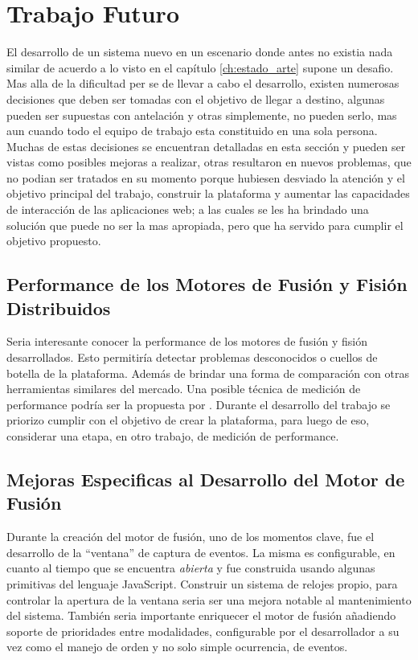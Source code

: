 \section{Trabajo Futuro} \label{sec:end_future}
El desarrollo de un sistema nuevo en un escenario donde antes no existia nada similar de acuerdo a lo visto en el capítulo \ref{ch:estado_arte} supone un desafio. Mas alla de la dificultad per se de llevar a cabo el desarrollo, existen numerosas decisiones que deben ser tomadas con el objetivo de llegar a destino, algunas pueden ser supuestas con antelación y otras simplemente, no pueden serlo, mas aun cuando todo el equipo de trabajo esta constituido en una sola persona. Muchas de estas decisiones se encuentran detalladas en esta sección y pueden ser vistas como posibles mejoras a realizar, otras resultaron en nuevos problemas, que no podian ser tratados en su momento porque hubiesen desviado la atención y el objetivo principal del trabajo, construir la plataforma y aumentar las capacidades de interacción de las aplicaciones web; a las cuales se les ha brindado una solución que puede no ser la mas apropiada, pero que ha servido para cumplir el objetivo propuesto.

\subsection{Performance de los Motores de Fusión y Fisión Distribuidos}
Seria interesante conocer la performance de los motores de fusión y fisión desarrollados. Esto permitiría detectar problemas desconocidos o cuellos de botella de la plataforma. Además de brindar una forma de comparación con otras herramientas similares del mercado. Una posible técnica de medición de performance podría ser la propuesta por \citet{dumas2009benchmarking}. Durante el desarrollo del trabajo se priorizo cumplir con el objetivo de crear la plataforma, para luego de eso, considerar una etapa, en otro trabajo, de medición de performance.

\subsection{Mejoras Especificas al Desarrollo del Motor de Fusión}
Durante la creación del motor de fusión, uno de los momentos clave, fue el desarrollo de la ``ventana'' de captura de eventos. La misma es configurable, en cuanto al tiempo que se encuentra \textit{abierta} y fue construida usando algunas primitivas del lenguaje JavaScript. Construir un sistema de relojes propio, para controlar la apertura de la ventana seria ser una mejora notable al mantenimiento del sistema. También seria importante enriquecer el motor de fusión añadiendo soporte de prioridades entre modalidades, configurable por el desarrollador a su vez como el manejo de orden y no solo simple ocurrencia, de eventos.

